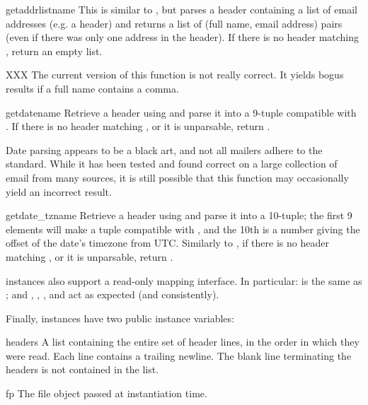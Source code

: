 \begin{funcdesc}{getaddrlist}{name}
This is similar to , but parses a header
containing a list of email addresses (e.g. a  header) and
returns a list of (full name, email address) pairs (even if there was
only one address in the header).  If there is no header matching
, return an empty list.

XXX The current version of this function is not really correct.  It
yields bogus results if a full name contains a comma.
\end{funcdesc}

\begin{funcdesc}{getdate}{name}
Retrieve a header using  and parse it into a 9-tuple
compatible with .  If there is no header matching
, or it is unparsable, return .

Date parsing appears to be a black art, and not all mailers adhere to
the standard.  While it has been tested and found correct on a large
collection of email from many sources, it is still possible that this
function may occasionally yield an incorrect result.
\end{funcdesc}

\begin{funcdesc}{getdate_tz}{name}
Retrieve a header using  and parse it into a 10-tuple;
the first 9 elements will make a tuple compatible with
, and the 10th is a number giving the offset of
the date's timezone from UTC.  Similarly to , if
there is no header matching , or it is unparsable, return
. 
\end{funcdesc}

 instances also support a read-only mapping interface.
In particular:  is the same as ;
and , , ,
 and  act as expected (and
consistently).

Finally,  instances have two public instance variables:

\begin{datadesc}{headers}
A list containing the entire set of header lines, in the order in
which they were read.  Each line contains a trailing newline.  The
blank line terminating the headers is not contained in the list.
\end{datadesc}

\begin{datadesc}{fp}
The file object passed at instantiation time.
\end{datadesc}
